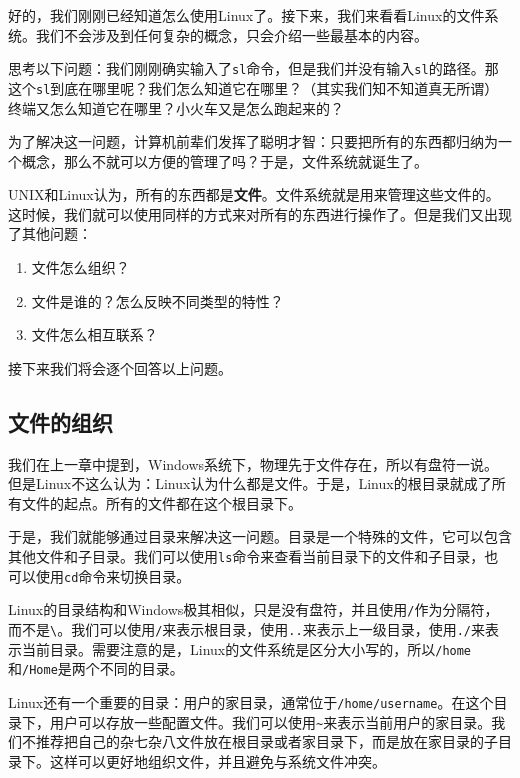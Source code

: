 好的，我们刚刚已经知道怎么使用Linux了。接下来，我们来看看Linux的文件系统。我们不会涉及到任何复杂的概念，只会介绍一些最基本的内容。

思考以下问题：我们刚刚确实输入了\texttt{sl}命令，但是我们并没有输入\texttt{sl}的路径。那这个\texttt{sl}到底在哪里呢？我们怎么知道它在哪里？（其实我们知不知道真无所谓）终端又怎么知道它在哪里？小火车又是怎么跑起来的？

为了解决这一问题，计算机前辈们发挥了聪明才智：只要把所有的东西都归纳为一个概念，那么不就可以方便的管理了吗？于是，文件系统就诞生了。

UNIX和Linux认为，所有的东西都是\textbf{文件}。文件系统就是用来管理这些文件的。这时候，我们就可以使用同样的方式来对所有的东西进行操作了。但是我们又出现了其他问题：

\begin{enumerate}
  \item 文件怎么组织？
  \item 文件是谁的？怎么反映不同类型的特性？
  \item 文件怎么相互联系？
\end{enumerate}

接下来我们将会逐个回答以上问题。

\subsection{文件的组织}

我们在上一章中提到，Windows系统下，物理先于文件存在，所以有盘符一说。但是Linux不这么认为：Linux认为什么都是文件。于是，Linux的根目录\text{/}就成了所有文件的起点。所有的文件都在这个根目录下。

于是，我们就能够通过目录来解决这一问题。目录是一个特殊的文件，它可以包含其他文件和子目录。我们可以使用\texttt{ls}命令来查看当前目录下的文件和子目录，也可以使用\texttt{cd}命令来切换目录。

Linux的目录结构和Windows极其相似，只是没有盘符，并且使用\texttt{/}作为分隔符，而不是\texttt{\textbackslash}。我们可以使用\texttt{/}来表示根目录，使用\texttt{..}来表示上一级目录，使用\texttt{./}来表示当前目录。需要注意的是，Linux的文件系统是区分大小写的，所以\texttt{/home}和\texttt{/Home}是两个不同的目录。

Linux还有一个重要的目录：用户的家目录，通常位于\texttt{/home/username}。在这个目录下，用户可以存放一些配置文件。我们可以使用\texttt{\textasciitilde}来表示当前用户的家目录。我们不推荐把自己的杂七杂八文件放在根目录或者家目录下，而是放在家目录的子目录下。这样可以更好地组织文件，并且避免与系统文件冲突。

